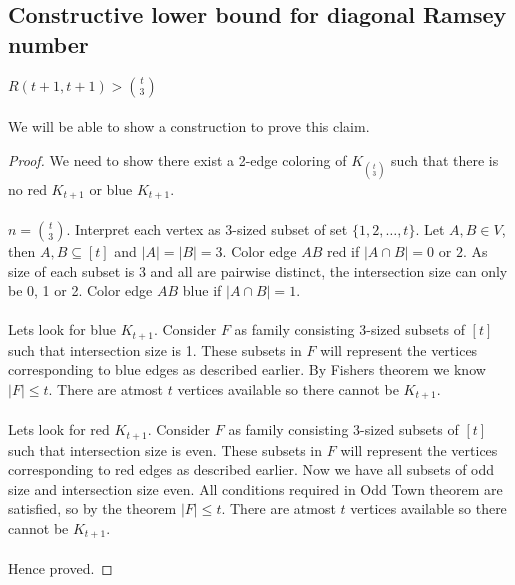 \subsection{Constructive lower bound for diagonal Ramsey number}
\begin{claim}
$R(t+1,t+1)> {t\choose 3}$\\\\
We will be able to show a construction to prove this claim.
\begin{proof}
We need to show there exist a 2-edge coloring of $K_{t\choose 3}$ such that there is no red $K_{t+1}$ or blue $K_{t+1}$.\\\\
$n={t\choose 3}$. Interpret each vertex as 3-sized subset of set $\{1, 2, \hdots, t\}$. Let $A,B \in V$, then $A,B \subseteq [t]$ and $|A|=|B|=3$. Color edge $AB$ red if $|A\cap B| =0$ or $2$. As size of each subset is 3 and all are pairwise distinct, the intersection size can only be 0, 1 or 2. Color edge $AB$ blue if $|A\cap B| =1$.\\\\
Lets look for blue $K_{t+1}$. Consider $F$ as family consisting 3-sized subsets of $[t]$ such that intersection size is 1. These subsets in $F$ will represent the vertices corresponding to blue edges as described earlier. By Fishers theorem we know $|F|\le t$. There are atmost $t$ vertices available so there cannot be $K_{t+1}$.\\\\
Lets look for red $K_{t+1}$. Consider $F$ as family consisting 3-sized subsets of $[t]$ such that intersection size is even. These subsets in $F$ will represent the vertices corresponding to red edges as described earlier. Now we have all subsets of odd size and intersection size even. All conditions required in Odd Town theorem are satisfied, so by the theorem $|F|\le t$. There are atmost $t$ vertices available so there cannot be $K_{t+1}$.\\\\
Hence proved.
\end{proof}
\end{claim}

